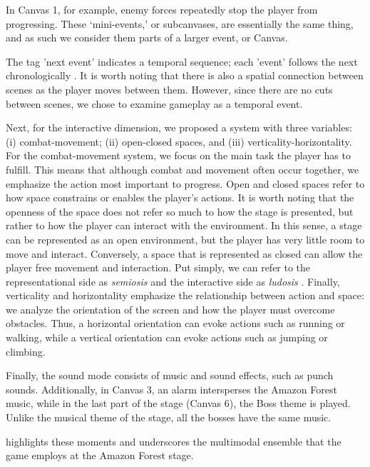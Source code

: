 \documentclass[english]{textolivre}
\begin{document}
In Canvas 1, for example, enemy forces repeatedly stop the player from progressing. These ‘mini-events,’ or subcanvases, are essentially the same thing, and as such we consider them parts of a larger event, or Canvas.

The tag 'next event' indicates a temporal sequence; each 'event' follows the next chronologically \cite[p. 225]{van_leeuwen_introducing_2005}. It is worth noting that there is also a spatial connection between scenes as the player moves between them. However, since there are no cuts between scenes, we chose to examine gameplay as a temporal event.

Next, for the interactive dimension, we proposed a system with three variables: (i) combat-movement; (ii) open-closed spaces, and (iii) verticality-horizontality. For the combat-movement system, we focus on the main task the player has to fulfill. This means that although combat and movement often occur together, we emphasize the action most important to progress. Open and closed spaces refer to how space constrains or enables the player's actions. It is worth noting that the openness of the space does not refer so much to how the stage is presented, but rather to how the player can interact with the environment. In this sense, a stage can be represented as an open environment, but the player has very little room to move and interact. Conversely, a space that is represented as closed can allow the player free movement and interaction. Put simply, we can refer to the representational side as \textit{semiosis} and the interactive side as \textit{ludosis} \cite[p. 19]{mayra_introduction_2008}. Finally, verticality and horizontality emphasize the relationship between action and space: we analyze the orientation of the screen and how the player must overcome obstacles. Thus, a horizontal orientation can evoke actions such as running or walking, while a vertical orientation can evoke actions such as jumping or climbing.

Finally, the sound mode consists of music and sound effects, such as punch sounds. Additionally, in Canvas 3, an alarm intersperses the Amazon Forest music, while in the last part of the stage (Canvas 6), the Boss theme is played. Unlike the musical theme of the stage, all the bosses have the same music.

highlights these moments and underscores the multimodal ensemble that the game employs at the Amazon Forest stage.
\end{document}

